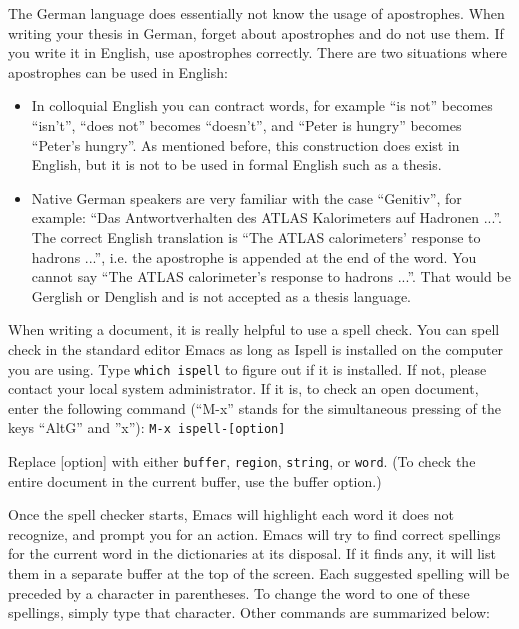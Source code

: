 \documentclass[bachelor,       %
               twoside,        %
               BCOR10mm,       %
               ngerman,english  %
               ]{GAUBM}
\begin{document}
%
%
The German language does essentially not know the usage of
apostrophes. When writing your thesis in German, forget about
apostrophes and do not use them. If you write it in English, use
apostrophes correctly. There are two situations where apostrophes can
be used in English:
\begin{itemize}
\item In colloquial English you can contract words, for example ``is
  not'' becomes ``isn't'', ``does not'' becomes ``doesn't'', and
  ``Peter is hungry'' becomes ``Peter's hungry''. As mentioned before,
  this construction does exist in English, but it is not to be used in
  formal English such as a thesis.
\item Native German speakers are very familiar with the case
  ``Genitiv'', for example: ``Das Antwortverhalten des ATLAS
  Kalorimeters auf Hadronen ...''. The correct English translation is
  ``The ATLAS calorimeters' response to hadrons ...'', i.e. the
  apostrophe is appended at the end of the word. You cannot say ``The
  ATLAS calorimeter's response to hadrons ...''. That would be
  Gerglish or Denglish and is not accepted as a thesis language.
\end{itemize}

 
%
%
When writing a document, it is really helpful to use a spell check.
You can spell check in the standard editor Emacs as long as Ispell is
installed on the computer you are using. Type {\tt which ispell} to
figure out if it is installed. If not, please contact your local
system administrator. If it is, to check an open document, enter the
following command (``M-x'' stands for the simultaneous pressing of the
keys ``AltG'' and ''x''): {\tt M-x ispell-[option]}

Replace [option] with either {\tt buffer}, {\tt region}, {\tt string},
or {\tt word}. (To check the entire document in the current buffer,
use the buffer option.)

Once the spell checker starts, Emacs will highlight each word it does
not recognize, and prompt you for an action. Emacs will try to find
correct spellings for the current word in the dictionaries at its
disposal. If it finds any, it will list them in a separate buffer at
the top of the screen. Each suggested spelling will be preceded by a
character in parentheses. To change the word to one of these
spellings, simply type that character. Other commands are summarized
below: 
\end{document}
